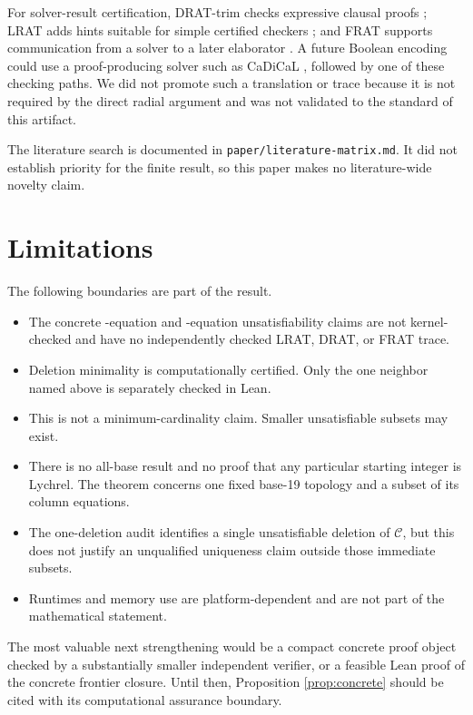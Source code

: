 \documentclass[11pt]{article}
\newcommand{\Ccandidate}{\ensuremath{\mathcal{C}}}
\begin{document}
For solver-result certification, DRAT-trim checks expressive clausal proofs
\cite{WetzlerHeuleHunt2014}; LRAT adds hints suitable for simple certified
checkers \cite{CruzFilipeEtAl2017}; and FRAT supports communication from a
solver to a later elaborator \cite{BaekCarneiroHeule2022}.  A future Boolean
encoding could use a proof-producing solver such as CaDiCaL
\cite{cadical301}, followed by one of these checking paths.  We did not
promote such a translation or trace because it is not required by the direct
radial argument and was not validated to the standard of this artifact.

The literature search is documented in \texttt{paper/literature-matrix.md}.
It did not establish priority for the finite result, so this paper makes no
literature-wide novelty claim.

\section{Limitations}

The following boundaries are part of the result.
\begin{itemize}[leftmargin=*]
  \item The concrete \CandidateEquationCount-equation and
        \CoreEquationCount-equation unsatisfiability claims are not
        kernel-checked and have no independently checked LRAT, DRAT, or FRAT
        trace.
  \item Deletion minimality is computationally certified.  Only the one
        neighbor named above is separately checked in Lean.
  \item This is not a minimum-cardinality claim.  Smaller unsatisfiable
        subsets may exist.
  \item There is no all-base result and no proof that any particular starting
        integer is Lychrel.  The theorem concerns one fixed base-19 topology
        and a subset of its column equations.
  \item The one-deletion audit identifies a single unsatisfiable deletion of
        \Ccandidate, but this does not justify an unqualified uniqueness claim
        outside those immediate subsets.
  \item Runtimes and memory use are platform-dependent and are not part of
        the mathematical statement.
\end{itemize}

The most valuable next strengthening would be a compact concrete proof object
checked by a substantially smaller independent verifier, or a feasible Lean
proof of the concrete frontier closure.  Until then, Proposition
\ref{prop:concrete} should be cited with its computational assurance boundary.

\begingroup
\small


\endgroup
\end{document}
